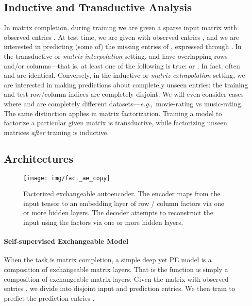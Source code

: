 \documentclass{article}
\newcommand{\eg}[0]{\emph{e.g.},~}
\theoremstyle{definition}
\begin{document}
\subsection{Inductive and Transductive Analysis}\label{sec:ind_trans}
In matrix completion, during training we are given a sparse input matrix  with observed entries . At test time, we are given  with observed entries , and we are interested in predicting (some of) the missing entries of , expressed through .
In the transductive or \textit{matrix interpolation} setting,  and  have overlapping rows and/or columns---that is, at least one of the following is true:
 or
.
In fact, often  and  are identical.
Conversely, in the inductive or \textit{matrix extrapolation} setting, we are interested in making predictions about completely unseen entries: the training and test row/column indices are completely disjoint.
We will even consider cases where  and  are completely different datasets---\eg movie-rating vs music-rating.
The same distinction applies in matrix factorization. Training a model to factorize a 
particular given matrix is transductive, while factorizing unseen 
matrices \emph{after} training is inductive. 

\subsection{Architectures}\label{sec:architectures}
\begin{figure}[t]\centering
\texttt{[image: img/fact\_ae\_copy]}
\vspace{-1.3em}\caption{Factorized exchangeable autoencoder. The encoder maps from the input tensor to an embedding layer of row / column factors via one or more hidden layers. The decoder attempts to reconstruct the input using the factors via one or more hidden layers.}
\label{fig:fact_ae}
\end{figure}

\paragraph{Self-supervised Exchangeable Model} When the task is matrix completion, a simple deep yet PE model is a 
composition of exchangeable matrix layers.
That is the function  is simply a composition of exchangeable matrix layers. Given the matrix  with observed entries ,
we divide  into disjoint input and prediction entries. 
We then train  to predict the prediction entries .
\end{document}
